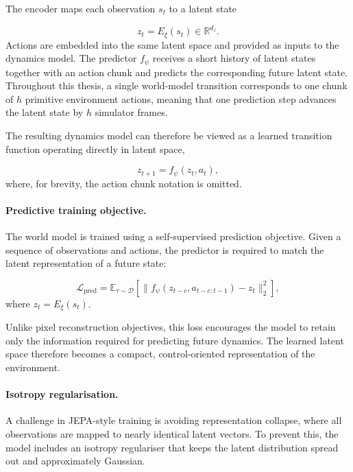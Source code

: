The encoder maps each observation $s_t$ to a latent state

\begin{equation}
z_t = E_\xi(s_t) \in \mathbb{R}^{d_z}.
\end{equation}
Actions are embedded into the same latent space and provided as inputs
to the dynamics model. The predictor $f_\psi$ receives a short history
of latent states together with an action chunk and predicts the
corresponding future latent state. Throughout this thesis, a single
world-model transition corresponds to one chunk of $h$ primitive
environment actions, meaning that one prediction step advances the
latent state by $h$ simulator frames.

The resulting dynamics model can therefore be viewed as a learned
transition function operating directly in latent space,

\begin{equation}
z_{t+1} = f_\psi(z_t,a_t),
\end{equation}
where, for brevity, the action chunk notation is omitted.

\paragraph{Predictive training objective.}

The world model is trained using a self-supervised prediction
objective. Given a sequence of observations and actions, the predictor
is required to match the latent representation of a future state:

\begin{equation}
\mathcal{L}_{\mathrm{pred}}
=
\mathbb{E}_{\tau\sim\mathcal D}
\left[
\big\|
f_\psi(z_{t-c},a_{t-c:t-1})
-
z_t
\big\|_2^2
\right],
\label{eq:pred-loss-clean}
\end{equation}
where $z_t=E_\xi(s_t)$.

Unlike pixel reconstruction objectives, this loss encourages the model
to retain only the information required for predicting future
dynamics. The learned latent space therefore becomes a compact,
control-oriented representation of the environment.

\paragraph{Isotropy regularisation.}

A challenge in JEPA-style training is avoiding representation collapse,
where all observations are mapped to nearly identical latent vectors.
To prevent this, the model includes an isotropy regulariser that keeps
the latent distribution spread out and approximately Gaussian.

